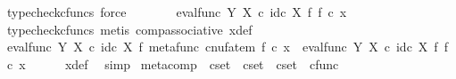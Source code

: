 \begin{isabellebody}
\ {\isacharparenleft}{\kern0pt}typecheck{\isacharunderscore}{\kern0pt}cfuncs{\isacharcomma}{\kern0pt}\ force{\isacharparenright}{\kern0pt}\isanewline
\ \ \isamarkupfalse%
\ \isamarkupfalse%
\ {\isachardoublequoteopen}{\isachardot}{\kern0pt}{\isachardot}{\kern0pt}{\isachardot}{\kern0pt}\ {\isacharequal}{\kern0pt}\ {\isacharparenleft}{\kern0pt}eval{\isacharunderscore}{\kern0pt}func\ Y\ X\ {\isasymcirc}\isactrlsub c\ id\isactrlsub c\ X\ {\isasymtimes}\isactrlsub f\ f{\isacharparenright}{\kern0pt}\ {\isasymcirc}\isactrlsub c\ x{}{\isachardoublequoteclose}\isanewline
\ \ \ \ \isamarkupfalse%
\ {\isacharparenleft}{\kern0pt}typecheck{\isacharunderscore}{\kern0pt}cfuncs{\isacharcomma}{\kern0pt}\ metis\ comp{\isacharunderscore}{\kern0pt}associative{}\ x{\isacharunderscore}{\kern0pt}def{\isacharparenright}{\kern0pt}\isanewline
\ \ \isamarkupfalse%
\ \isamarkupfalse%
\ {\isachardoublequoteopen}{\isacharparenleft}{\kern0pt}eval{\isacharunderscore}{\kern0pt}func\ Y\ X\ {\isasymcirc}\isactrlsub c\ id\isactrlsub c\ X\ {\isasymtimes}\isactrlsub f\ metafunc\ {\isacharparenleft}{\kern0pt}cnufatem\ f{\isacharparenright}{\kern0pt}{\isacharparenright}{\kern0pt}\ {\isasymcirc}\isactrlsub c\ x{}\ {\isacharequal}{\kern0pt}\ {\isacharparenleft}{\kern0pt}eval{\isacharunderscore}{\kern0pt}func\ Y\ X\ {\isasymcirc}\isactrlsub c\ id\isactrlsub c\ X\ {\isasymtimes}\isactrlsub f\ f{\isacharparenright}{\kern0pt}\ {\isasymcirc}\isactrlsub c\ x{}{\isachardoublequoteclose}\isanewline
\ \ \ \ \isamarkupfalse%
\ x{\isacharunderscore}{\kern0pt}def\ \isamarkupfalse%
\ simp\isanewline
{}\isamarkupfalse%
%
\endisatagproof
{\isafoldproof}%
%
\isadelimproof
%
\endisadelimproof
%
\isadelimdocument
%
\endisadelimdocument
%
\isatagdocument
%
\isamarkuptrue%
%
\endisatagdocument
{\isafolddocument}%
%
\isadelimdocument
%
\endisadelimdocument
{}\isamarkupfalse%
\ meta{\isacharunderscore}{\kern0pt}comp\ {\isacharcolon}{\kern0pt}{\isacharcolon}{\kern0pt}\ {\isachardoublequoteopen}cset\ {\isasymRightarrow}\ cset\ {\isasymRightarrow}\ cset\ {\isasymRightarrow}\ cfunc{\isachardoublequoteclose}\ \ \ \isanewline

\end{isabellebody}
